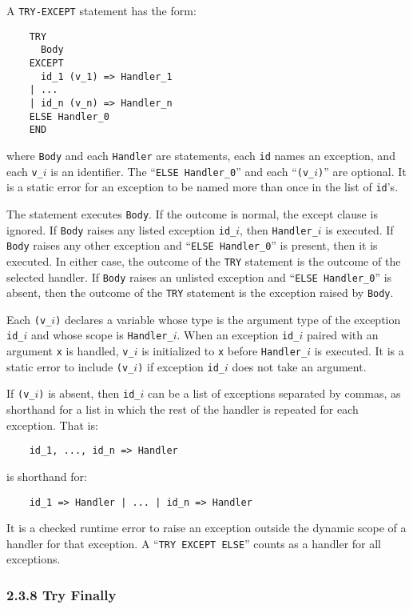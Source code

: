 \documentclass[10pt]{article}
\begin{document}
A \verb|TRY-EXCEPT| statement has the form:
\begin{verbatim}
    TRY
      Body
    EXCEPT
      id_1 (v_1) => Handler_1
    | ...
    | id_n (v_n) => Handler_n
    ELSE Handler_0
    END
\end{verbatim}
where \verb|Body| and each \verb|Handler| are statements, each \verb|id| names
an exception, and each \verb|v_|$i$ is an identifier.  The
``\verb|ELSE Handler_0|'' and each ``\verb|(v_|$i$\verb|)|'' are optional.
It is a static error for an exception to be named more than once in the list
of \verb|id|'s.

The statement executes \verb|Body|.  If the outcome is normal, the except
clause is ignored.  If \verb|Body| raises any listed exception \verb|id_|$i$,
then \verb|Handler_|$i$ is executed.  If \verb|Body| raises any other
exception and ``\verb|ELSE Handler_0|'' is present, then it is executed.  In
either case, the outcome of the \verb|TRY| statement is the outcome of the
selected handler.  If \verb|Body| raises an unlisted exception and
``\verb|ELSE Handler_0|'' is absent, then the outcome of the \verb|TRY|
statement is the exception raised by \verb|Body|.

Each \verb|(v_|$i$\verb|)| declares a variable whose type is the argument type
of the exception \verb|id_|$i$ and whose scope is \verb|Handler_|$i$.  When an
exception \verb|id_|$i$ paired with an argument \verb|x| is handled,
\verb|v_|$i$ is initialized to \verb|x| before \verb|Handler_|$i$ is executed.
It is a static error to include \verb|(v_|$i$\verb|)| if exception
\verb|id_|$i$ does not take an argument.

If \verb|(v_|$i$\verb|)| is absent, then \verb|id_|$i$ can be a list of
exceptions separated by commas, as shorthand for a list in which the rest of
the handler is repeated for each exception.  That is:
\begin{verbatim}
    id_1, ..., id_n => Handler
\end{verbatim}
is shorthand for:
\begin{verbatim}
    id_1 => Handler | ... | id_n => Handler
\end{verbatim}

It is a checked runtime error to raise an exception outside the dynamic scope
of a handler for that exception.  A ``\verb|TRY EXCEPT ELSE|'' counts as a
handler for all exceptions.

\subsubsection*{2.3.8 Try Finally}
\end{document}
